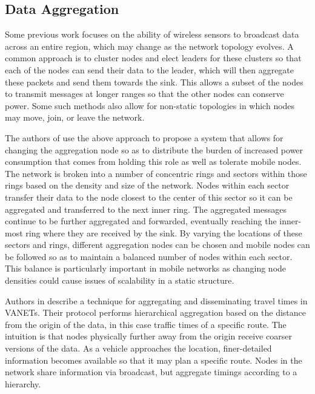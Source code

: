 \documentclass{IEEEtran}
\begin{document}
\subsection{Data Aggregation}

Some previous work focuses on the ability of wireless sensors to broadcast data across an entire region, which may change as the network topology evolves.
A common approach is to cluster nodes and elect leaders for these clusters so that each of the nodes can send their data to the leader, which will then aggregate these packets and send them towards the sink.  This allows a subset of the nodes to transmit messages at longer ranges so that the other nodes can conserve power.  Some such methods also allow for non-static topologies in which nodes may move, join, or leave the network.

The authors of \cite{sct} use the above approach to propose a system that allows for changing the aggregation node so as to distribute the burden of increased power consumption that comes from holding this role as well as tolerate mobile nodes.  The network is broken into a number of concentric rings and sectors within those rings based on the density and size of the network.
Nodes within each sector transfer their data to the node closest to the center of this sector so it can be aggregated and transferred to the next inner ring. The aggregated messages continue to be further aggregated and forwarded, eventually reaching the inner-most ring where they are received by the sink.
By varying the locations of these sectors and rings, different aggregation nodes can be chosen and mobile nodes can be followed so as to maintain a balanced number of nodes within each sector.  This balance is particularly important in mobile networks as changing node densities could cause issues of scalability in a static structure.

Authors in \cite{landmark} describe a technique for aggregating and disseminating travel times in VANETs. Their protocol performs hierarchical aggregation based on the distance from the origin of the data, in this case traffic times of a specific route. The intuition is that nodes physically further away from the origin receive coarser versions of the data. As a vehicle approaches the location, finer-detailed information becomes available so that it may plan a specific route. Nodes in the network share information via broadcast, but aggregate timings according to a hierarchy.
\end{document}
